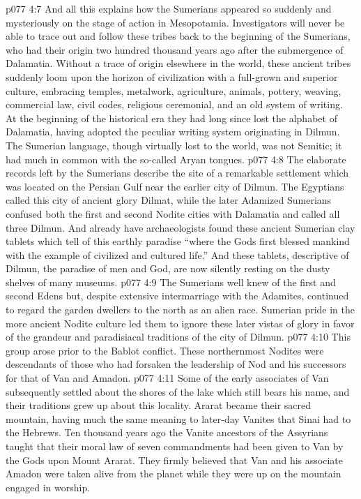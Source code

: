 \vs p077 4:7 And all this explains how the Sumerians appeared so suddenly and mysteriously on the stage of action in Mesopotamia. Investigators will never be able to trace out and follow these tribes back to the beginning of the Sumerians, who had their origin two hundred thousand years ago after the submergence of Dalamatia. Without a trace of origin elsewhere in the world, these ancient tribes suddenly loom upon the horizon of civilization with a full\hyp{}grown and superior culture, embracing temples, metalwork, agriculture, animals, pottery, weaving, commercial law, civil codes, religious ceremonial, and an old system of writing. At the beginning of the historical era they had long since lost the alphabet of Dalamatia, having adopted the peculiar writing system originating in Dilmun. The Sumerian language, though virtually lost to the world, was not Semitic; it had much in common with the so\hyp{}called Aryan tongues.
\vs p077 4:8 The elaborate records left by the Sumerians describe the site of a remarkable settlement which was located on the Persian Gulf near the earlier city of Dilmun. The Egyptians called this city of ancient glory Dilmat, while the later Adamized Sumerians confused both the first and second Nodite cities with Dalamatia and called all three Dilmun. And already have archaeologists found these ancient Sumerian clay tablets which tell of this earthly paradise “where the Gods first blessed mankind with the example of civilized and cultured life.” And these tablets, descriptive of Dilmun, the paradise of men and God, are now silently resting on the dusty shelves of many museums.
\vs p077 4:9 The Sumerians well knew of the first and second Edens but, despite extensive intermarriage with the Adamites, continued to regard the garden dwellers to the north as an alien race. Sumerian pride in the more ancient Nodite culture led them to ignore these later vistas of glory in favor of the grandeur and paradisiacal traditions of the city of Dilmun.
\pc \vs p077 4:10 \bibnobreakspace {} This group arose prior to the Bablot conflict. These northernmost Nodites were descendants of those who had forsaken the leadership of Nod and his successors for that of Van and Amadon.
\pc \vs p077 4:11 Some of the early associates of Van subsequently settled about the shores of the lake which still bears his name, and their traditions grew up about this locality. Ararat became their sacred mountain, having much the same meaning to later\hyp{}day Vanites that Sinai had to the Hebrews. Ten thousand years ago the Vanite ancestors of the Assyrians taught that their moral law of seven commandments had been given to Van by the Gods upon Mount Ararat. They firmly believed that Van and his associate Amadon were taken alive from the planet while they were up on the mountain engaged in worship.
